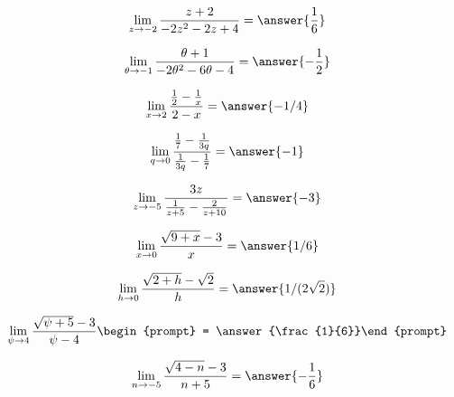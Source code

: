 \documentclass[handout]{ximera}
\begin{document}
\begin{exercise}
\[
\lim_{z\to -2 } \frac{z+2}{-2 z^2-2 z+4} = \answer{\frac{1}{6}}
\]
\end{exercise}


\begin{exercise}
\[
\lim_{\theta\to -1 } \frac{\theta +1}{-2 \theta ^2-6 \theta -4} = \answer{-\frac{1}{2}}
\]
\end{exercise}

\begin{exercise}
\[\lim_{x \to 2} \frac{\frac{1}{2}-\frac{1}{x}}{2-x} = \answer{-1/4}\]
\end{exercise}

\begin{exercise}
\[\lim_{q \to 0} \frac{\frac{1}{7}-\frac{1}{3q}}{\frac{1}{3q}-\frac{1}{7}} = \answer{-1}\]
\end{exercise}

\begin{exercise}
\[\lim_{z \to -5} \frac{3z}{\frac{1}{z+5}-\frac{2}{z+10}} = \answer{-3}\]
\end{exercise}

\begin{exercise}
\[\lim_{x \to 0} \frac{\sqrt{9+x}-3}{x} = \answer{1/6}\]

\end{exercise}

\begin{exercise}
	\[\lim_{h \to 0} \frac{\sqrt{2+h} - \sqrt{2}}{h} = \answer{1/(2\sqrt{2})}\]

\end{exercise}

\begin{exercise}
\[
\lim_{\psi\to 4 } \frac{\sqrt{\psi +5}-3}{\psi -4}\begin{prompt} = \answer{\frac{1}{6}}\end{prompt}
\]
\end{exercise}

\begin{exercise}
\[
\lim_{n\to -5 } \frac{\sqrt{4-n}-3}{n+5}= \answer{-\frac{1}{6}}
\]
\end{exercise}
\end{document}

